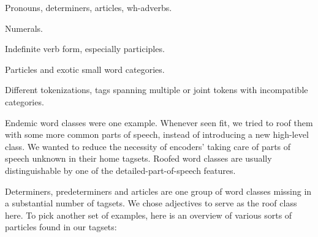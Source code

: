 \documentclass[11pt]{article}
\begin{document}
\begin{compactitem}
\item Pronouns, determiners, articles, wh-adverbs.
\item Numerals.
\item Indefinite verb form, especially participles. %
\item Particles and exotic small word categories.
\item Different tokenizations, tags spanning multiple or joint tokens with incompatible categories. %
\end{compactitem}

Endemic word classes were one example. Whenever seen fit, we tried to roof them with some more common parts of speech, instead of introducing a new high-level class. We wanted to reduce the necessity of encoders’ taking care of parts of speech unknown in their home tagsets. Roofed word classes are usually distinguishable by one of the detailed-part-of-speech features.

Determiners, predeterminers and articles are one group of word classes missing in a substantial number of tagsets. We chose adjectives to serve as the roof class here. To pick another set of examples, here is an overview of various sorts of particles found in our tagsets:
\end{document}
